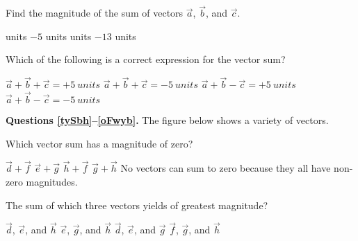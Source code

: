 \documentclass[]{exam}
\begin{document}
\begin{questions}
\question \label{1t4zH}
Find the magnitude of the sum of vectors $\vec{a}$, $\vec{b}$, and $\vec{c}$.

\begin{randomizechoices}
     units
    \choice $-5$ units
     units
    \choice $-13$ units
\end{randomizechoices}

\question \label{PUVyz}
Which of the following is a correct expression for the vector sum?

\begin{randomizechoices}
    \correctchoice $\vec{a} + \vec{b} + \vec{c} = +\SI{5}{units}$
    \choice $\vec{a} + \vec{b} + \vec{c} = -\SI{5}{units}$
    \choice \choice $\vec{a} + \vec{b} - \vec{c} = +\SI{5}{units}$
    \choice \choice $\vec{a} + \vec{b} - \vec{c} = -\SI{5}{units}$
\end{randomizechoices}

\begin{EnvUplevel}
\textbf{Questions \ref{tySbh}--\ref{oFwyb}.} The figure below shows a variety of vectors.

\begin{center}
\end{center}
\end{EnvUplevel}

\question \label{tySbh}
Which vector sum has a magnitude of zero?

\begin{randomizechoices}[keeplast]
    \correctchoice $\vec{d} + \vec{f}$
    \choice $\vec{e} + \vec{g}$
    \choice $\vec{h} + \vec{f}$
    \choice $\vec{g} + \vec{h}$
    \choice No vectors can sum to zero because they all have non-zero magnitudes.
\end{randomizechoices}

\question
The sum of which three vectors yields of greatest magnitude?

\begin{randomizechoices}
    \correctchoice $\vec{d}$, $\vec{e}$, and $\vec{h}$
    \choice $\vec{e}$, $\vec{g}$, and $\vec{h}$
    \choice $\vec{d}$, $\vec{e}$, and $\vec{g}$
    \choice $\vec{f}$, $\vec{g}$, and $\vec{h}$
\end{randomizechoices}


\end{questions}
\end{document}
